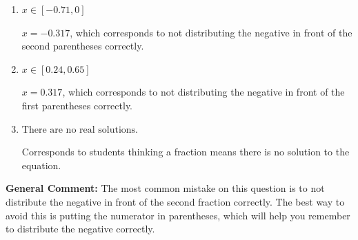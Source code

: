\documentclass{extbook}[14pt]
\begin{document}
\begin{enumerate}
{\begin{enumerate}[label=\Alph*.]
$x = 6.900$, which corresponds to getting the negative of the actual solution.
\item \( x \in [-0.71, 0] \)

$x = -0.317$, which corresponds to not distributing the negative in front of the second parentheses correctly.
\item \( x \in [0.24, 0.65] \)

$x = 0.317$, which corresponds to not distributing the negative in front of the first parentheses correctly.
\item \( \text{There are no real solutions.} \)

Corresponds to students thinking a fraction means there is no solution to the equation.
\end{enumerate}

\textbf{General Comment:} The most common mistake on this question is to not distribute the negative in front of the second fraction correctly. The best way to avoid this is putting the numerator in parentheses, which will help you remember to distribute the negative correctly.
}
\end{enumerate}
\end{document}
